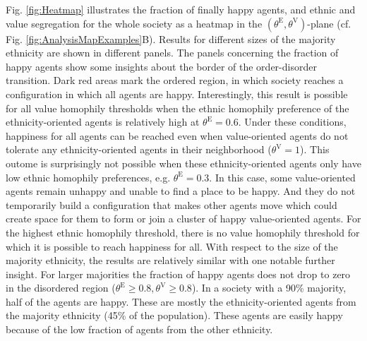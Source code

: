 \documentclass{ws-acs}
\begin{document}
{Fig. \ref{fig:Heatmap} illustrates the fraction of finally happy agents, and ethnic and value segregation for the whole society as a heatmap in the $(\theta^\text{E},\theta^\text{V})$-plane (cf. Fig. \ref{fig:AnalysisMapExamples}B). Results for different sizes of the majority ethnicity are shown in different panels. The panels concerning the fraction of happy agents show some insights about the border of the order-disorder transition. Dark red areas mark the ordered region, in which society reaches a configuration in which all agents are happy. Interestingly, this result is possible for all value homophily thresholds when the ethnic homophily preference of the ethnicity-oriented agents is relatively high at $\theta^\text{E}=0.6$. Under these conditions, happiness for all agents can be reached even when value-oriented agents do not tolerate any ethnicity-oriented agents in their neighborhood ($\theta^\text{V}=1$). This outome is surprisingly not possible when these ethnicity-oriented agents only have low ethnic homophily preferences, e.g. $\theta^\text{E}=0.3$. In this case, some value-oriented agents remain unhappy and unable to find a place to be happy. And they do not temporarily build a configuration that makes other agents move which could create space for them to form or join a cluster of happy value-oriented agents. For the highest ethnic homophily threshold, there is no value homophily threshold for which it is possible to  reach happiness for all. With respect to the size of the majority ethnicity, the results are relatively similar with one notable further insight. For larger majorities the fraction of happy agents does not drop to zero in the disordered region ($\theta^\text{E}\geq 0.8, \theta^\text{V}\geq 0.8$). In a society with a 90\% majority, half of the agents are happy. These are mostly the ethnicity-oriented agents from the majority ethnicity (45\% of the population). These agents are easily happy because of the low fraction of agents from the other ethnicity. 

}
\end{document}
